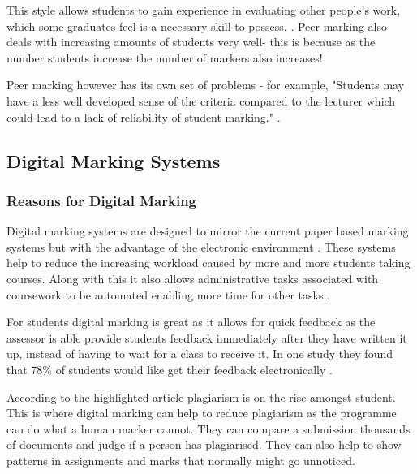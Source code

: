 \documentclass[12pt]{article}  %
\begin{document}
This style allows  students to gain experience in evaluating other people's work, which some graduates feel is a necessary skill to possess. \cite{langan_insights_????}. Peer marking also deals with increasing amounts of students very well- this is because as the number students increase the number of markers also increases!


Peer marking however has its own set of problems - for example, "Students may have a less well developed sense of the criteria compared to the lecturer which could lead to a lack of reliability of student marking." \cite{orsmond_use_2000}.






\subsection{Digital Marking Systems}


\subsubsection{Reasons for Digital Marking}
Digital marking systems are designed to mirror the current paper based marking systems but with the advantage of the electronic environment \cite{heinrich_online_2003}. These systems help to reduce the increasing workload caused by more and more students taking courses. Along with this it also allows administrative tasks associated with coursework to be automated enabling more time for other tasks.\cite{joy_effective_1998}.


For students digital marking is great as it allows for quick feedback as the assessor is able provide students feedback immediately after they have written it up, instead of having to wait for a class to receive it. In one study\cite{dahl_turnitin_2007} they found that 78\% of students would like get their feedback  electronically .


According to the highlighted article \cite{derby_duplication_2008} plagiarism is on the rise amongst student. This is where digital marking can help to reduce plagiarism as the programme can  do what a human marker cannot. They can compare a submission thousands of documents and judge if a person has plagiarised. They can also help to show patterns in assignments and marks that normally might go unnoticed. 
\end{document}
